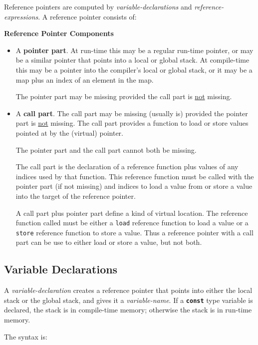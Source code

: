 \documentclass[12pt]{article}
\newcommand{\TT}[1]{{\tt \bfseries #1}}
\newcommand{\key}[1]{{\rm \bfseries #1}}
\begin{document}
Reference pointers are computed by {\em variable-declarations} and
{\em reference-expressions}.  A reference pointer consists of:

\bigskip

\centerline{\bf Reference Pointer Components}\label{REFERENCE-POINTER-COMPONENTS}
\begin{itemize}
\item A \key{pointer part}.
At run-time this may be a regular run-time pointer,
or may be a similar pointer that points into a local or global
stack.
At compile-time this may be a pointer into the compiler's local or global
stack, or it may be a map plus an index of an element in the map.

The pointer part may be missing provided the call part is \underline{not}
missing.
\item A \key{call part}.
The call part may be missing (usually is) provided the pointer part
is \underline{not} missing.
The call part provides a function to load or store values
pointed at by the (virtual) pointer.

The pointer part and the call part cannot both be missing.

The call part
is the declaration of a reference function plus values of any
indices used by that function.  This reference function must be called with
the pointer part (if not missing) and indices to
load a value from or store a value into the target of the reference pointer.

A call part plus pointer part define a kind of virtual
location.  The reference function called must be either a {\tt load}
reference function to load a value or a
{\tt store} reference function to store a value.  Thus a reference pointer
with a call part can be use to either load or store a value, but not both.

\end{itemize}

\subsection{Variable Declarations}
\label{VARIABLE-DECLARATIONS}

A {\em variable-declaration} creates a reference pointer that
points into either the local stack or the global stack,
and gives it a {\em variable-name}.  If a \TT{const} type variable
is declared, the stack is in compile-time memory; otherwise the
stack is in run-time memory.

The syntax is:
\end{document}
